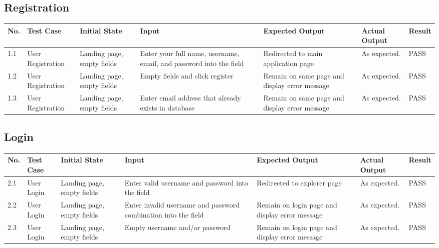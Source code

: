 \documentclass{article}
\begin{document}
\subsection{Registration}
\begingroup
\begin{tabular}{ | p{0.5cm} | p{2cm} | p{2cm} | p{2cm} |p{2cm} |p{2cm} |p{1cm} |} 
    \hline
    \textbf{No.} & \textbf{Test Case} & \textbf{Initial State} & \textbf{Input}& \textbf{Expected Output}& \textbf{Actual Output}& \textbf{Result}\\
    \hline
    1.1 & User Registration & Landing page, empty fields &  Enter your full name, username, email, and password into the field & Redirected to main application page & As expected. & PASS\\
    \hline
    1.2 & User Registration & Landing page, empty fields & Empty fields and click register & Remain on same page and display error message. & As expected. & PASS\\
    \hline
    1.3 & User Registration & Landing page, empty fields & Enter email address that already exists in database & Remain on same page and display error message. & As expected. & PASS\\
    \hline
\end{tabular}
\endgroup

\subsection{Login}
\begingroup
\begin{tabular}{ | p{0.5cm} | p{2cm} | p{2cm} | p{2cm} |p{2cm} |p{2cm} |p{1cm} |} 
    \hline
    \textbf{No.} & \textbf{Test Case} & \textbf{Initial State} & \textbf{Input}& \textbf{Expected Output}& \textbf{Actual Output}& \textbf{Result}\\
    \hline
    2.1 & User Login & Landing page, empty fields &  Enter valid username and password into the field & Redirected to explorer page & As expected. & PASS\\
    \hline
    2.2 & User Login & Landing page, empty fields &  Enter invalid username and password combination into the field & Remain on login page and display error message & As expected. & PASS\\
    \hline
    2.3 & User Login & Landing page, empty fields & Empty username and/or password  & Remain on login page and display error message & As expected. & PASS\\
    \hline
\end{tabular}
\endgroup
\end{document}
